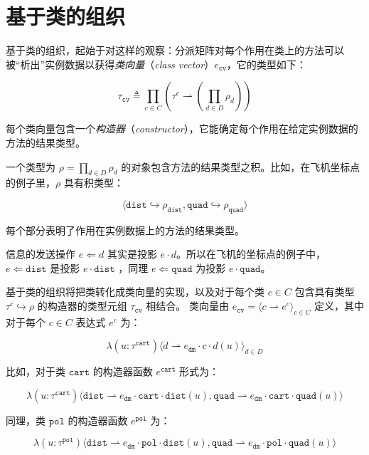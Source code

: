 \section{基于类的组织}

基于类的组织，起始于对这样的观察：分派矩阵对每个作用在类上的方法可以被“析出”实例数据以获得\textit{类向量}（\textit{class vector}）$ e_{\mathtt{cv}} $，它的类型如下：

$$ \tau_{\mathtt{cv}} \triangleq \prod_{c \in C}(\tau^{c} \rightharpoonup (\prod_{d \in D} \rho_{d})) $$

每个类向量包含一个\textit{构造器}（\textit{constructor}），它能确定每个作用在给定实例数据的方法的结果类型。

一个类型为 $ \rho = \prod_{d \in D} \rho_{d} $ 的对象包含方法的结果类型之积。比如，在飞机坐标点的例子里，$ \rho $ 具有积类型：

$$ \langle \mathtt{dist} \hookrightarrow \rho_{\mathtt{dist}}, \mathtt{quad} \hookrightarrow \rho_{\mathtt{quad}} \rangle $$

每个部分表明了作用在实例数据上的方法的结果类型。

信息的发送操作 $e \Leftarrow d $ 其实是投影 $ e \cdot d $。所以在飞机的坐标点的例子中，$e \Leftarrow \mathtt{dist} $ 是投影 $ e \cdot \mathtt{dist} $ ，同理 $ e \Leftarrow \mathtt{quad} $ 为投影 $ e \cdot \mathtt{quad} $。

基于类的组织将把类转化成类向量的实现，以及对于每个类 $c \in C$ 包含具有类型 $\tau^{c} \hookrightarrow \rho $ 的构造器的类型元组 $ \tau_{\mathtt{cv}} $ 相结合。
类向量由 $ e_{\mathtt{cv}} = \langle c \rightharpoonup e^{c} \rangle_{c \in C} $ 定义，其中对于每个 $c \in C$ 表达式 $ e^{c} $ 为：

$$ \lambda(u : \tau^{\mathtt{cart}})\langle d \rightharpoonup e_{\mathtt{dm}} \cdot c \cdot d(u) \rangle_{d \in D} $$

比如，对于类 $ \mathtt{cart} $ 的构造器函数 $e^{\mathtt{cart}}$ 形式为：

$$ \lambda(u : \tau^{\mathtt{cart}}) \langle \mathtt{dist} \rightharpoonup e_{\mathtt{dm}} \cdot \mathtt{cart} \cdot \mathtt{dist}(u), \mathtt{quad} \rightharpoonup e_{\mathtt{dm}} \cdot \mathtt{cart} \cdot \mathtt{quad}(u) \rangle $$

同理，类 $ \mathtt{pol} $ 的构造器函数 $e^{\mathtt{pol}}$ 为：

$$ \lambda(u : \tau^{\mathtt{pol}}) \langle \mathtt{dist} \rightharpoonup e_{\mathtt{dm}} \cdot {\mathtt{pol}} \cdot \mathtt{dist}(u), \mathtt{quad} \rightharpoonup e_{\mathtt{dm}} \cdot {\mathtt{pol}} \cdot \mathtt{quad}(u) \rangle $$

